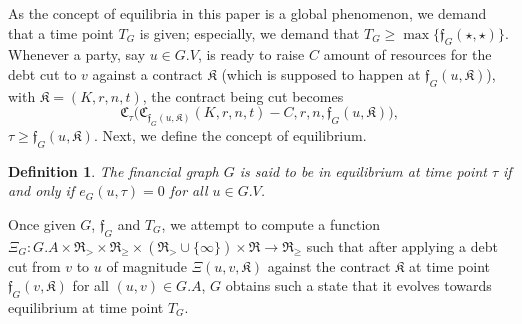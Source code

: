 \documentclass[10pt]{article}
\newcommand{\RR}{\mathfrak{R}}
\newcommand{\KK}{\mathfrak{K}}
\newcommand{\CC}{\mathfrak{C}}
\newcommand{\ff}{\mathfrak{f}}
\newtheorem{mydef}{Definition}
\begin{document}
As the concept of equilibria in this paper is a global phenomenon, we demand that a time point $T_G$ is given; especially, we demand that $T_G \geq \max \{ \ff_G(\star, \star) \}$. Whenever a party, say $u \in G.V$, is ready to raise $C$ amount of resources for the debt cut to $v$ against a contract $\KK$ (which is supposed to happen at $\ff_G(u, \KK)$), with $\KK = (K, r, n, t)$, the contract being cut becomes 
\[
\CC_{\tau}\big(\CC_{\ff_G(u, \KK)}(K, r, n, t) - C, r, n, \ff_G(u, \KK) \big),
\]
$\tau \geq \ff_G(u, \KK)$.
 Next, we define the concept of equilibrium.
\begin{mydef}
The financial graph $G$ is said to be in equilibrium at time point $\tau$ if and only if $e_G(u,\tau) = 0$ for all $u \in G.V$.
\end{mydef}
Once given $G$, $\ff_G$ and $T_G$, we attempt to compute a function $\Xi_G \colon G.A \times \RR_> \times \RR_{\geq} \times (\RR_> \cup \{ \infty \}) \times \RR \to \RR_{\geq}$ such that after applying a debt cut from $v$ to $u$ of magnitude $\Xi(u, v, \KK)$ against the contract $\KK$ at time point $\ff_G(v, \KK)$ for  all $(u, v) \in G.A$, $G$ obtains such a state that it evolves towards equilibrium at time point $T_G$.
\end{document}
